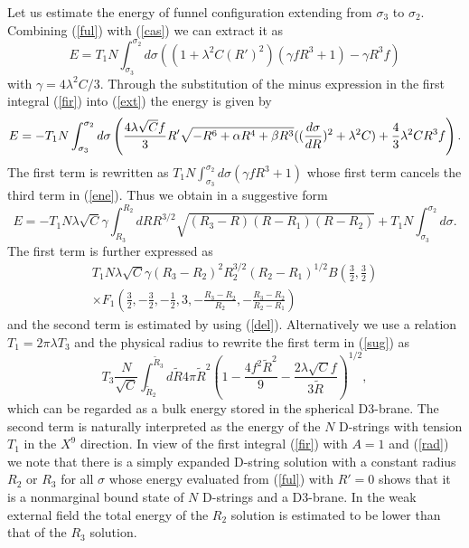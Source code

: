 \documentclass[12pt,a4paper]{article}
\newcommand{\la}{\lambda}
\newcommand{\al}{\alpha}
\begin{document}
Let us estimate the energy of funnel configuration extending from 
$\sigma_3$ to $\sigma_2$. Combining (\ref{ful}) with (\ref{cas})
we can extract it as 
\begin{equation}
E = T_1N\int_{\sigma_3}^{\sigma_2}d\sigma((1 + \la^2C(R')^2)
(\gamma fR^3 + 1) - \gamma R^3f)
\label{ext}\end{equation}
with $\gamma=4\la^2C/3$. Through the substitution of 
the minus expression in the first integral (\ref{fir}) into 
(\ref{ext}) the energy is given by
\begin{equation}
E = -T_1N \int_{\sigma_3}^{\sigma_2}d\sigma \left( 
\frac{4\la\sqrt{C}f}{3} R' \sqrt{-R^6 + \al R^4 
+ \beta R^3}((\frac{d\sigma}{dR})^2 + \la^2C ) \nonumber \\
 + \frac{4}{3}\la^2CR^3f \right).
\label{ene}\end{equation}
 The first term is rewritten as 
$T_1N\int_{\sigma_3}^{\sigma_2}d\sigma (\gamma fR^3 +1)$ whose first term
cancels the third term in (\ref{ene}). Thus we obtain 
in a suggestive form
\begin{equation}
E = -T_1N\la\sqrt{C}\gamma\int_{R_3}^{R_2} dR R^{3/2}
\sqrt{(R_3-R)(R-R_1)(R-R_2)} + T_1N\int_{\sigma_3}^{\sigma_2}d\sigma.
\label{sug}\end{equation}
The first term is further expressed as
\begin{eqnarray}
T_1N\la\sqrt{C}\gamma (R_3-R_2)^2R_2^{3/2}(R_2-R_1)^{1/2}
B\left(\frac{3}{2},\frac{3}{2}\right) \nonumber \\
\times F_1\left(\frac{3}{2},-\frac{3}{2},
-\frac{1}{2},3,-\frac{R_3-R_2}{R_2},-\frac{R_3-R_2}{R_2-R_1}\right)
\end{eqnarray}
and the second term is estimated by using (\ref{del}). Alternatively
we use a relation $T_1 = 2\pi\la T_3$ and the physical radius to
rewrite the first term in (\ref{sug}) as
\begin{equation}
T_3 \frac{N}{\sqrt{C}}\int_{\tilde{R}_2}^{\tilde{R}_3} d\tilde{R}
4\pi \tilde{R}^2\left( 1 - \frac{4f^2\tilde{R}^2}{9}
-\frac{2\la\sqrt{C}f}{3\tilde{R}}\right)^{1/2},
\end{equation}
which can be regarded as a bulk energy stored in the spherical 
D3-brane. The second term is naturally interpreted as the energy
of the $N$ D-strings with tension $T_1$ in the $X^9$ direction.
In view of the first integral (\ref{fir}) with $A=1$ and (\ref{rad})
we note that there is a simply expanded D-string solution with a
constant radius $R_2$ or $R_3$ for all $\sigma$ whose energy 
evaluated from (\ref{ful}) with $R'=0$ shows that it is a
nonmarginal bound state of $N$ D-strings and a D3-brane.
In the weak external field the total energy of the $R_2$ solution is
estimated to be lower than that of the $R_3$ solution.
\end{document}
